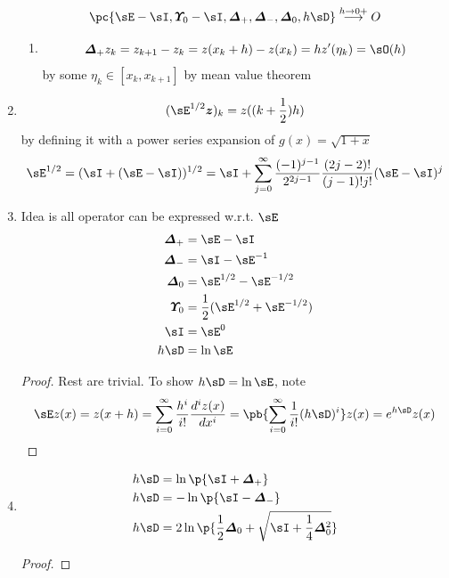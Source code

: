 \documentclass[11pt]{article}
\begin{document}
\begin{enumerate}
    \[
        \pc{\shift-\id, \avg - \id, \forw, \back, \cent, h\diff} \overset{h\to 0+}{\longrightarrow} O
    \]
    \begin{enumerate}
        \item {} 
        \[
            \forw z_k = z_{k+1} - z_k =  z(x_k + h) - z(x_k) = hz'(\eta_k) = \sO(h)
        \]
        by some $\eta_k \in [x_k, x_{k+1}]$ by mean value theorem
    \end{enumerate}
    \item {}
    \[
        (\shift^{1/2} \bz)_k = z((k+\frac{1}{2})h)
    \]
    by defining it with a power series expansion of $g(x) = \sqrt{1+x}$
    \[
        \shift^{1/2} = (\id + (\shift - \id))^{1/2} = \id + \sum_{j=0}^{\infty} \frac{ (-1)^{j-1} }{ 2^{2j - 1} } \frac{(2j - 2)!}{(j-1)!j!}  (\shift - \id)^j
    \]
    \item {} Idea is all operator can be expressed w.r.t. $\shift$
    \begin{align*}
        \forw 
            &= \shift - \id \\
        \back
            &= \id - \shift^{-1} \\ 
        \cent
            &= \shift^{1/2} - \shift^{-1/2} \\
        \avg
            &= \frac{1}{2} (\shift^{1/2} + \shift^{-1/2}) \\
        \id
            &= \shift^0 \\
        h\diff
            &= \ln \shift
    \end{align*}
    \begin{proof}
        Rest are trivial. To show $h\diff = \ln\shift$, note 
        \[
            \shift z(x) = z(x+h) = 
            \sum_{i=0}^{\infty} \frac{h^i}{i!} \frac{d^i z(x)}{dx^i}
            = \pb{
                \sum_{i=0}^{\infty} \frac{1}{i!} (h\diff)^i
            } z(x)
            = e^{h\diff} z(x)
        \]
    \end{proof}
    \item {} 
    \begin{align*}
        h\diff
            &= \ln \p{\id + \forw} \\
        h\diff
            &= -\ln \p{\id - \back} \\
        h\diff
            &= 2\ln \p{\frac{1}{2}\cent + \sqrt{\id + \frac{1}{4}\cent^2}}
    \end{align*}
    \begin{proof}

\end{proof}
\end{enumerate}
\end{document}

